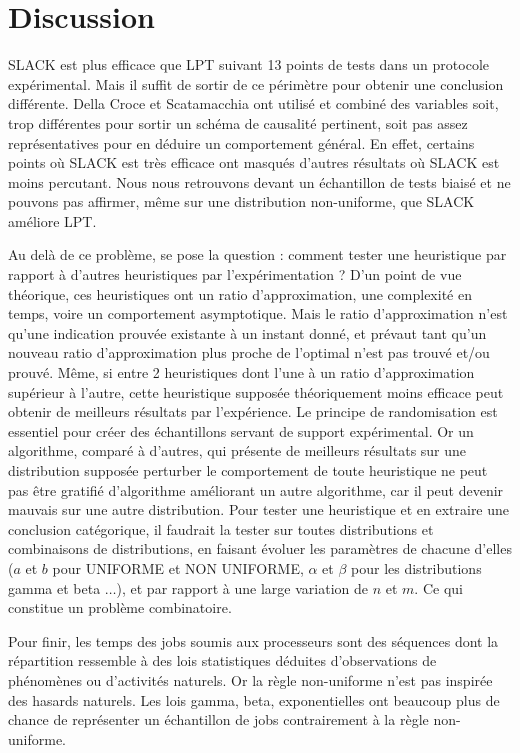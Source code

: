 \documentclass[a4paper,12pt]{report}
\theoremstyle{plain}				%
\theoremstyle{definition}				%
\begin{document}
\section{Discussion} \label{sec:discussion}

SLACK est plus efficace que LPT suivant 13 points de tests 
  dans un protocole expérimental. 
Mais il suffit de sortir de ce périmètre pour obtenir 
  une conclusion différente. 
Della Croce et Scatamacchia ont utilisé et combiné des variables 
  soit, trop différentes pour sortir un schéma de causalité pertinent, 
  soit pas assez représentatives pour en déduire un comportement général.  
En effet, certains points où SLACK est très efficace ont masqués 
  d'autres résultats où SLACK est moins percutant. 
Nous nous retrouvons devant un échantillon de tests biaisé et ne pouvons pas affirmer, même sur une distribution non-uniforme, que SLACK améliore LPT. 

Au delà de ce problème, se pose la question : comment tester une heuristique par rapport à d'autres heuristiques par l'expérimentation ?
D'un point de vue théorique, ces heuristiques ont un ratio d'approximation, 
  une complexité en temps, voire un comportement asymptotique. 
Mais le ratio d’approximation n’est qu'une indication prouvée existante 
  à un instant donné, et prévaut tant qu'un nouveau ratio d'approximation 
  plus proche de l'optimal n'est pas trouvé et/ou prouvé. 
Même, si entre 2 heuristiques dont l'une à un ratio d'approximation 
  supérieur à l'autre, cette heuristique supposée théoriquement moins 
  efficace peut obtenir de meilleurs résultats par l'expérience.      
Le principe de randomisation est essentiel pour créer des échantillons servant 
  de support expérimental. 
Or un algorithme, comparé à d'autres, qui présente de meilleurs résultats 
  sur une distribution supposée perturber le comportement de toute heuristique 
  ne peut pas être gratifié d'algorithme améliorant un autre algorithme, 
  car il peut devenir mauvais sur une autre distribution. 
Pour tester une heuristique et en extraire une conclusion catégorique, 
  il faudrait la tester sur toutes distributions et combinaisons 
  de distributions, en faisant évoluer les paramètres de chacune d'elles 
 ($a$ et $b$ pour UNIFORME et NON UNIFORME, $\alpha$ et $\beta$ 
  pour les distributions gamma et beta $\ldots$), 
  et par rapport à une large variation de $n$ et $m$.  
Ce qui constitue un problème combinatoire.

Pour finir, les temps des jobs soumis aux processeurs sont des séquences dont la répartition ressemble à des 
  lois statistiques déduites d'observations de phénomènes ou d'activités naturels. 
Or la règle non-uniforme n'est pas inspirée des hasards naturels. 
Les lois gamma, beta, exponentielles ont beaucoup plus de chance de représenter un échantillon de jobs
  contrairement à la règle non-uniforme. 
\end{document}
